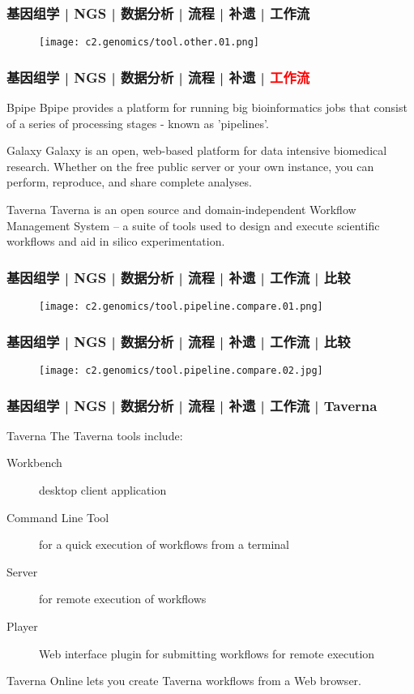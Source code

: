 \begin{frame}
  \frametitle{基因组学 | NGS | 数据分析 | 流程 | 补遗 | 工作流}
  \begin{figure}
    \centering
    \texttt{[image: c2.genomics/tool.other.01.png]}
  \end{figure}
\end{frame}

\begin{frame}
  \frametitle{基因组学 | NGS | 数据分析 | 流程 | 补遗 | \textcolor{red}{工作流}}
  \begin{block}{Bpipe}
    Bpipe provides a platform for running big bioinformatics jobs that consist of a series of processing stages - known as 'pipelines'.
  \end{block}
  \pause
  \begin{block}{Galaxy}
    Galaxy is an open, web-based platform for data intensive biomedical research. Whether on the free public server or your own instance, you can perform, reproduce, and share complete analyses.
  \end{block}
  \pause
  \begin{block}{Taverna}
    Taverna is an open source and domain-independent Workflow Management System – a suite of tools used to design and execute scientific workflows and aid in silico experimentation.
  \end{block}
\end{frame}

\begin{frame}
  \frametitle{基因组学 | NGS | 数据分析 | 流程 | 补遗 | 工作流 | 比较}
  \begin{figure}
    \centering
    \texttt{[image: c2.genomics/tool.pipeline.compare.01.png]}
  \end{figure}
\end{frame}

\begin{frame}
  \frametitle{基因组学 | NGS | 数据分析 | 流程 | 补遗 | 工作流 | 比较}
  \begin{figure}
    \centering
    \texttt{[image: c2.genomics/tool.pipeline.compare.02.jpg]}
  \end{figure}
\end{frame}

\begin{frame}
  \frametitle{基因组学 | NGS | 数据分析 | 流程 | 补遗 | 工作流 | Taverna}
  \begin{block}{Taverna}
    The Taverna tools include:
    \begin{description}
      \item[Workbench] desktop client application
      \item[Command Line Tool] for a quick execution of workflows from a terminal
      \item[Server] for remote execution of workflows
      \item[Player] Web interface plugin for submitting workflows for remote execution
    \end{description}
    Taverna Online lets you create Taverna workflows from a Web browser.
  \end{block}
\end{frame}

